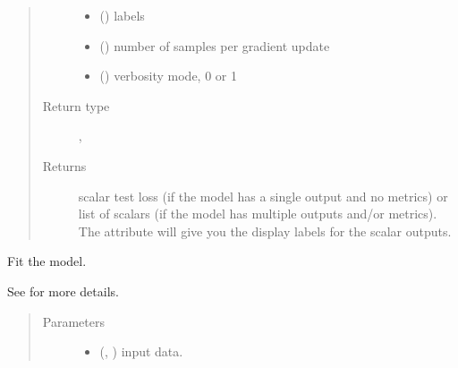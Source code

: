 \documentclass[letterpaper,10pt,english]{sphinxmanual}
\begin{document}
\begin{fulllineitems}
\begin{fulllineitems}
\begin{quote}
\begin{description}
\begin{itemize}
\item {} 
 () \textendash{} labels

\item {} 
 () \textendash{} number of samples per gradient update

\item {} 
 () \textendash{} verbosity mode, 0 or 1

\end{itemize}

\item[{Return type}] \leavevmode
\sphinxcode{\sphinxupquote{Union}}{[}, \sphinxcode{\sphinxupquote{List}}{[}\sphinxcode{\sphinxupquote{float}}{]}{]}

\item[{Returns}] \leavevmode
scalar test loss (if the model has a single output and no
metrics) or list of scalars (if the model has multiple outputs
and/or metrics). The attribute  will
give you the display labels for the scalar outputs.

\end{description}\end{quote}

\end{fulllineitems}


\begin{fulllineitems}
\label{\detokenize{matchzoo.engine:matchzoo.engine.base_model.BaseModel.fit}}
Fit the model.

See  for more details.
\begin{quote}\begin{description}
\item[{Parameters}] \leavevmode\begin{itemize}
\item {} 
 (\sphinxcode{\sphinxupquote{Union}}{[}, \sphinxcode{\sphinxupquote{List}}{[}\sphinxcode{\sphinxupquote{ndarray}}{]}{]}) \textendash{} input data.


\end{itemize}
\end{description}
\end{quote}
\end{fulllineitems}
\end{fulllineitems}
\end{document}
